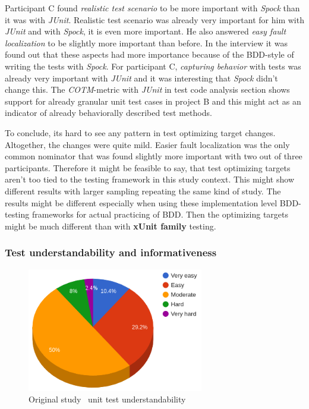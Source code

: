 Participant C found \textit{realistic test
scenario} to be more important with \textit{Spock} than it was with \textit{JUnit}. Realistic test scenario was already very important for him
with \textit{JUnit} and with \textit{Spock}, it is even more important. He also answered \textit{easy fault localization} to be slightly
more important than before. In the interview it was found out that these aspects had more importance because of the BDD-style of writing
the tests with \textit{Spock}. For participant C, \textit{capturing behavior} with tests was already very important with \textit{JUnit} and it was
interesting that \textit{Spock} didn't change this. The \textit{COTM}-metric with \textit{JUnit} in test code analysis section shows support
for already granular unit test cases in project B and this might act as an indicator of already behaviorally described test methods.

To conclude, its hard to see any pattern in test optimizing target changes. Altogether, the changes were quite mild.
Easier fault localization was the only common nominator that was found slightly more important with two out of three
participants. Therefore it might be feasible to say, that test optimizing targets aren't too tied to the testing framework in this study context.
This might show different results with larger sampling repeating the same kind of study. The results might be different especially when using these
implementation level BDD-testing frameworks for actual practicing of BDD. Then the optimizing targets might be much different
than with \textbf{xUnit family} testing.

\subsubsection{Test understandability and informativeness }

    \begin{figure}[H]
      \begin{center}
        \includegraphics[width=7.7cm]{images/org-understandability.png}
        \caption{Original study~\cite{li2016automatically} unit test understandability}
        \label{fig:org-understandability}
      \end{center}
    \end{figure}

